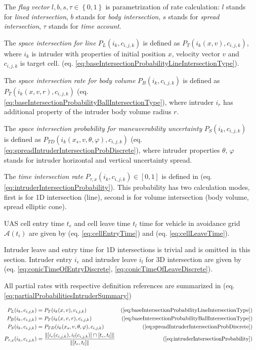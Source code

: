 \noindent The \emph{flag vector} $l,b,s,\tau \in \left\{0,1\right\}$ is parametrization of rate calculation: $l$ stands for \emph{lined intersection}, $b$ stands for \emph{body intersection}, $s$ stands for \emph{spread intersection}, $\tau$ stands for \emph{time account}. 

The \emph{space intersection for line} $P_L(i_k,c_{i,j,k})$ is defined as $P_T(i_k({x},{v}),c_{i,j,k})$, where $i_k$ is intruder with properties of initial position ${x}$, velocity vector ${v}$ and $c_{i,j,k}$ is target cell. (eq. \ref{eq:baseIntersectionProbabilityLineIntersectionType}). 

The \emph{space intersection rate for body volume} $P_B(i_k,c_{i,j,k})$ is defined as $P_T(i_k({x},{v},r),c_{i,j,k})$ (eq. \ref{eq:baseIntersectionProbabilityBallIntersectionType}), where intruder $i_r$ has additional property of the intruder body volume radius $r$. 

The \emph{space intersection probability for maneuverability uncertainty} $P_S(i_k,c_{i,j,k})$ is defined as $P_{TD}(i_k({x}_s,{v},\theta,\varphi),c_{i,j,k})$ (eq. \ref{eq:spreadIntruderIntersectionProbDiscrete}), where intruder properties $\theta$, $\varphi$ stands for intruder horizontal and vertical uncertainty spread.

The \emph{time intersection rate} $P_{\tau,x}(i_k,c_{i,j,k})\in[0,1]$ is defined in (eq. \ref{eq:intruderIntersectionProbability}). This probability has two calculation modes, first is for 1D intersection (line), second is for volume intersection (body volume, spread elliptic cone).  

UAS cell entry time $t_e$ and cell leave time  $t_l$ time for vehicle in avoidance grid $\mathscr{A}(t_i)$ are given by (eq. \ref{eq:cellEntryTime}) and (eq. \ref{eq:cellLeaveTime}). 

Intruder leave and entry time for 1D intersections is trivial and is omitted in this section. Intruder entry $i_e$ and intruder leave $i_l$ for 3D intersection are given by (eq. \ref{eq:conicTimeOfEntryDiscrete}, \ref{eq:conicTimeOfLeaveDiscrete}). 

All partial rates with respective definition references are summarized in (eq. \ref{eq:partialProbabilitiesIntruderSummary})

\begin{equation}\label{eq:partialProbabilitiesIntruderSummary}
    \begin{aligned}
        P_L(i_k,c_{i,j,k}) &= P_T(i_k({x},{v}),c_{i,j,k}) &(\ref{eq:baseIntersectionProbabilityLineIntersectionType})\\
        P_B(i_k,c_{i,j,k}) &= P_T(i_k({x},{v},r),c_{i,j,k}) &(\ref{eq:baseIntersectionProbabilityBallIntersectionType})\\
        P_S(i_k,c_{i,j,k}) &= P_{TD}(i_k({x}_s,{v},\theta,\varphi),c_{i,j,k}) &(\ref{eq:spreadIntruderIntersectionProbDiscrete})\\
        P_{\tau,x}(i_k,c_{i,j,k})&=\frac{\left\lVert[i_e(c_{i,j,k}),i_l(c_{i,j,k})]\cap [t_e,t_l]\right\rVert}{\left\lVert[t_e,t_l]\right\rVert}& (\ref{eq:intruderIntersectionProbability})\\
    \end{aligned}
\end{equation}

